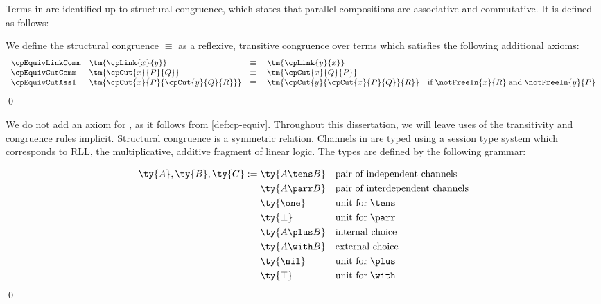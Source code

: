 \documentclass[UKenglish]{llncs}
\begin{document}
Terms in \cp are identified up to structural congruence, which states that
parallel compositions  are associative and commutative.
It is defined as follows:
\begin{definition}\label{def:cp-equiv}
  We define the structural congruence $\equiv$ as a reflexive, transitive
  congruence over terms which satisfies the following additional axioms:
  \[
    \begin{array}{llll}
      \cpEquivLinkComm
      & \tm{\cpLink{x}{y}}
      & \equiv \;
      & \tm{\cpLink{y}{x}}
      \\
      \cpEquivCutComm
      & \tm{\cpCut{x}{P}{Q}}
      & \equiv \;
      & \tm{\cpCut{x}{Q}{P}}
      \\
      \cpEquivCutAss1
      & \tm{\cpCut{x}{P}{\cpCut{y}{Q}{R}}}
      & \equiv \;
      & \tm{\cpCut{y}{\cpCut{x}{P}{Q}}{R}}
        \quad \text{if} \; \notFreeIn{x}{R} \; \text{and} \; \notFreeIn{y}{P}
    \end{array}
  \]
  \qed
\end{definition}
We do not add an axiom for , as it follows from
\cref{def:cp-equiv}.
Throughout this dissertation, we will leave uses of the transitivity and
congruence rules implicit.
Structural congruence is a symmetric relation.
%
Channels in \cp are typed using a session type system which corresponds to RLL,
the multiplicative, additive fragment of linear logic.
The types are defined by the following grammar:
\begin{definition}[Types]\label{def:cp-types}
  \[\!
    \begin{aligned}
      \ty{A}, \ty{B}, \ty{C}
           :=& \; \ty{A \tens B} &&\text{pair of independent channels}
      \\ \mid& \; \ty{A \parr B} &&\text{pair of interdependent channels}
      \\ \mid& \; \ty{\one}      &&\text{unit for} \; {\tens}
      \\ \mid& \; \ty{\bot}      &&\text{unit for} \; {\parr}
      \\ \mid& \; \ty{A \plus B} &&\text{internal choice}
      \\ \mid& \; \ty{A \with B} &&\text{external choice}
      \\ \mid& \; \ty{\nil}      &&\text{unit for} \; {\plus}
      \\ \mid& \; \ty{\top}      &&\text{unit for} \; {\with}
    \end{aligned}
  \]  
  \qed
\end{definition}
\end{document}
